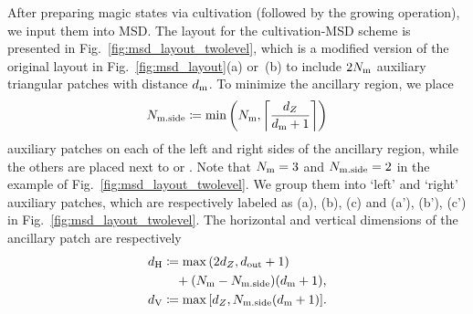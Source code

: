 \documentclass[
 prx,
 reprint,
 superscriptaddress,
 longbibliography,
 dvipsnames
]{revtex4-2}
\begin{document}
After preparing magic states via cultivation (followed by the growing operation), we input them into MSD.
The layout for the cultivation-MSD scheme is presented in Fig.~\ref{fig:msd_layout_twolevel}, which is a modified version of the original layout in Fig.~\ref{fig:msd_layout}(a) or~(b) to include $2N_{\mathrm{m}}$ auxiliary triangular patches with distance $d_{\mathrm{m}}$.
To minimize the ancillary region, we place
\begin{align*}
    N_{\mathrm{m.side}} \coloneqq \min\qty(N_{\mathrm{m}}, \left\lceil \frac{{d_Z}}{d_{\mathrm{m}} + 1} \right\rceil)
\end{align*}
auxiliary patches on each of the left and right sides of the ancillary region, while the others are placed next to \patchab or \patchout.
Note that $N_{\mathrm{m}} = 3$ and $N_{\mathrm{m.side}} = 2$ in the example of Fig.~\ref{fig:msd_layout_twolevel}.
We group them into `left' and `right' auxiliary patches, which are respectively labeled as (a), (b), (c) and (a'), (b'), (c') in Fig.~\ref{fig:msd_layout_twolevel}. 
The horizontal and vertical dimensions of the ancillary patch are respectively
\begin{align}
\begin{split}
    d_{\mathrm{H}} &\coloneqq \max\qty(2{d_Z}, d_{\mathrm{out}} + 1) \\ 
    &\quad + \qty(N_{\mathrm{m}} - N_{\mathrm{m.side}})\qty(d_{\mathrm{m}} + 1), \\ 
    d_{\mathrm{V}} &\coloneqq \max\qty[{d_Z}, N_{\mathrm{m.side}}\qty(d_{\mathrm{m}} + 1)].
\end{split}
\label{eq:combined_scheme_anc_region_dim}
\end{align}

\end{document}
